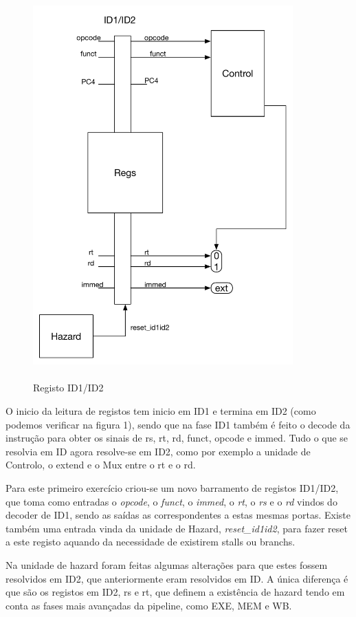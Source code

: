 \documentclass[pdftex,12pt,a4paper]{report}
\begin{document}
\begin{figure}[!htb]
\center
 \includegraphics[width=100mm,scale=1]{ID1ID2ex1.pdf}
 \caption{\\ Registo ID1/ID2}
 \label{fig:ex1RegID1ID2}
\end{figure}

O inicio da leitura de registos tem inicio em ID1 e termina em ID2 (como podemos verificar na figura 1), sendo que na fase ID1 também é feito o decode da instrução para obter os sinais de rs, rt, rd, funct, opcode e immed.  Tudo o que se resolvia em ID agora resolve-se em ID2, como por exemplo a unidade de Controlo, o extend e o Mux entre o rt e o rd.

Para este primeiro exercício criou-se um novo barramento de registos ID1/ID2, que toma como entradas o \textit{opcode}, o \textit{funct}, o \textit{immed}, o \textit{rt}, o \textit{rs} e o \textit{rd} vindos do decoder de ID1, sendo as saídas as correspondentes a estas mesmas portas. Existe também uma entrada vinda da unidade de Hazard, \textit{reset\_id1id2}, para fazer reset a este registo aquando da necessidade de existirem stalls ou branchs.

Na unidade de hazard foram feitas algumas alterações para que estes fossem resolvidos em ID2, que anteriormente eram resolvidos em ID. A única diferença é que são os registos em ID2, rs e rt, que definem a existência de hazard tendo em conta as fases mais avançadas da pipeline, como EXE, MEM e WB.
\end{document}

